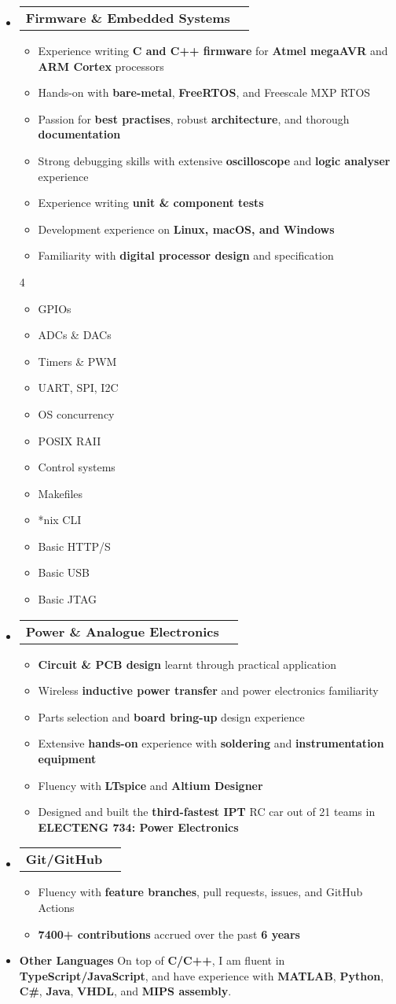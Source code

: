\documentclass[11pt,a4paper]{article}[leftmargin=*]
\makeatletter
\def \entryspacing {-0pt}
\def \bulletstylei {\faAngleRight\hspace{-4.5pt}}
\newcommand{\resumeEntryStart}{\begin{itemize}[leftmargin=2.5mm]}
\newcommand{\resumeEntryEnd}{\end{itemize}\vspace{\entryspacing}}
\newcommand{\resumeItemListStart}{\begin{itemize}[leftmargin=4.5mm]}
\newcommand{\resumeItemListEnd}{\end{itemize}}
\newcommand{\resumeItemListStartColumns}[2][-0.5]{\vspace*{#1\multicolsep}
\begin{multicols}{#2}\begin{itemize}[leftmargin=4.5mm]}
\newcommand{\resumeItemListEndColumns}[1][-1]{\end{itemize}\end{multicols}\vspace*{#1\multicolsep}}
\newcommand{\resumeItem}[2][\bulletstylei]{
  \item[\small#1]\small{
    {#2 \vspace{-2pt}}
  }
}
\newcommand{\resumeEntryTD}[2]{
  \vspace{-1pt}\item[]
    \begin{tabularx}{0.97\textwidth}{X@{\hspace{60pt}}r}
      \textbf{\color{primary}#1} & {\firabook\color{accent}\small#2} \\
    \end{tabularx}\vspace{-6pt}
}
\newcommand{\resumeEntryS}[2]{
  \item[]\small{
    \textbf{\color{primary}#1 }{ #2 \vspace{-4pt}}
  }
}
\newcommand{\resumeBf}[1]{\small\textbf{\color{halfbold}#1}}
\makeatother
\begin{document}
\resumeEntryStart
\resumeEntryTD
{Firmware \& Embedded Systems}{}
\resumeItemListStart
\resumeItem {Experience writing \resumeBf{C and C++ firmware} for \resumeBf{Atmel megaAVR} and \resumeBf{ARM Cortex} processors}
\resumeItem {Hands-on with \resumeBf{bare-metal}, \resumeBf{FreeRTOS}, and Freescale MXP RTOS}
\resumeItem {Passion for \resumeBf{best practises}, robust \resumeBf{architecture}, and thorough \resumeBf{documentation}}
\resumeItem {Strong debugging skills with extensive \resumeBf{oscilloscope} and \resumeBf{logic analyser} experience}
\resumeItem {Experience writing \resumeBf{unit \& component tests}}
\resumeItem {Development experience on \resumeBf{Linux, macOS, and Windows}}
\resumeItem {Familiarity with \resumeBf{digital processor design} and specification}
\resumeItemListEnd
\resumeItemListStartColumns[-0.5]{4}
\resumeItem {GPIOs}
\resumeItem {ADCs \& DACs}
\resumeItem {Timers \& PWM}
\resumeItem {UART, SPI, I2C}
\resumeItem {OS concurrency}
\resumeItem {POSIX RAII}
\resumeItem {Control systems}
\resumeItem {Makefiles}
\resumeItem {*nix CLI}
\resumeItem {Basic HTTP/S}
\resumeItem {Basic USB}
\resumeItem {Basic JTAG}
\resumeItemListEndColumns
\resumeEntryEnd

\resumeEntryStart
\resumeEntryTD
{Power \& Analogue Electronics}{}
\resumeItemListStart
\resumeItem {\resumeBf{Circuit \& PCB design} learnt through practical application}
\resumeItem {Wireless \resumeBf{inductive power transfer} and power electronics familiarity}
\resumeItem {Parts selection and \resumeBf{board bring-up} design experience}
\resumeItem {Extensive \resumeBf{hands-on} experience with \resumeBf{soldering} and \resumeBf{instrumentation equipment}}
\resumeItem {Fluency with \resumeBf{LTspice} and \resumeBf{Altium Designer}}
\resumeItem {Designed and built the \resumeBf{third-fastest IPT} RC car out of 21 teams in \resumeBf{ELECTENG 734: Power Electronics}}
\resumeItemListEnd
\resumeEntryEnd

\resumeEntryStart
\resumeEntryTD
{Git/GitHub}{}
\resumeItemListStart
\resumeItem {Fluency with \resumeBf{feature branches}, pull requests, issues, and GitHub Actions}
\resumeItem {\resumeBf{7400+ contributions} accrued over the past \resumeBf{6 years}}
\resumeItemListEnd
\resumeEntryEnd

\resumeEntryStart
\resumeEntryS
{Other Languages}{On top of \resumeBf{C/C++}, I am fluent in \resumeBf{TypeScript/JavaScript}, and have experience with \resumeBf{MATLAB}, \resumeBf{Python}, \resumeBf{C\#}, \resumeBf{Java}, \resumeBf{VHDL}, and \resumeBf{MIPS assembly}.}
\resumeEntryEnd
\end{document}
